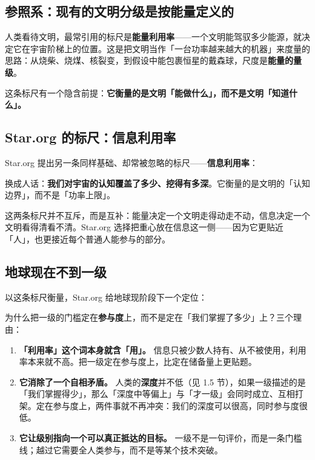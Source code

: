 \documentclass[11pt,fontset=none]{ctexart}
\begin{document}
\subsection{参照系：现有的文明分级是按能量定义的}

人类看待文明，最常引用的标尺是\textbf{能量利用率}——一个文明能驾驭多少能源，就决定它在宇宙阶梯上的位置。这是把文明当作「一台功率越来越大的机器」来度量的思路：从烧柴、烧煤、核裂变，到假设中能包裹恒星的戴森球，尺度是\textbf{能量的量级}。

这条标尺有一个隐含前提：\textbf{它衡量的是文明「能做什么」，而不是文明「知道什么」。}

\subsection{Star.org 的标尺：信息利用率}

Star.org 提出另一条同样基础、却常被忽略的标尺——\textbf{信息利用率}：


换成人话：\textbf{我们对宇宙的认知覆盖了多少、挖得有多深}。它衡量的是文明的「认知边界」，而不是「功率上限」。

这两条标尺并不互斥，而是互补：能量决定一个文明走得动走不动，信息决定一个文明看得清看不清。Star.org 选择把重心放在信息这一侧——因为它更贴近「人」，也更接近每个普通人能参与的部分。

\subsection{地球现在不到一级}

以这条标尺衡量，Star.org 给地球现阶段下一个定位：


为什么把一级的门槛定在\textbf{参与度}上，而不是定在「我们掌握了多少」上？三个理由：

\begin{enumerate}
  \item \textbf{「利用率」这个词本身就含「用」。} 信息只被少数人持有、从不被使用，利用率本来就不高。把一级定在参与度上，比定在储备量上更贴题。
  \item \textbf{它消除了一个自相矛盾。} 人类的\textbf{深度}并不低（见 1.5 节），如果一级描述的是「我们掌握得少」，那么「深度中等偏上」与「才一级」会同时成立、互相打架。定在参与度上，两件事就不再冲突：我们的深度可以很高，同时参与度很低。
  \item \textbf{它让级别指向一个可以真正抵达的目标。} 一级不是一句评价，而是一条门槛线；越过它需要全人类参与，而不是等某个技术突破。
\end{enumerate}
\end{document}
